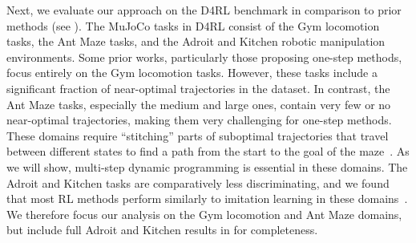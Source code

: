 \documentclass{article} %
\begin{document}
Next, we evaluate our approach on the D4RL benchmark in comparison to prior methods (see ).
The MuJoCo tasks in D4RL consist of the Gym locomotion tasks, the Ant Maze tasks, and the Adroit and Kitchen robotic manipulation environments. Some prior works, particularly those proposing one-step methods, focus entirely on the Gym locomotion tasks. However, these tasks include a significant fraction of near-optimal trajectories in the dataset. In contrast, the Ant Maze tasks, especially the medium and large ones, contain very few or no near-optimal trajectories, making them very challenging for one-step methods. These domains require ``stitching'' parts of suboptimal trajectories that travel between different states to find a path from the start to the goal of the maze~\citep{fu2020d4rl}. As we will show, multi-step dynamic programming is essential in these domains. The Adroit and Kitchen tasks are comparatively less discriminating, and we found that most RL methods perform similarly to imitation learning in these domains~\citep{florence2021implicit}. We therefore focus our analysis on the Gym locomotion and Ant Maze domains, but include full Adroit and Kitchen results in  for completeness.

\vspace{-0.15in}
\end{document}
